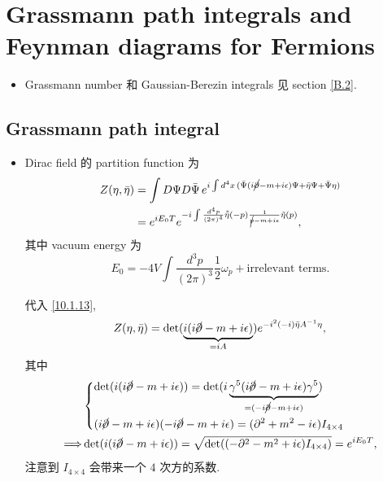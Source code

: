 \chapter{Grassmann path integrals and Feynman diagrams for Fermions}
\begin{itemize}
	\item Grassmann number 和 Gaussian-Berezin integrals 见 section \ref{B.2}.
\end{itemize}

\section{Grassmann path integral}
\begin{itemize}
	\item Dirac field 的 partition function 为
	\begin{align}
		Z(\eta, \bar{\eta}) &= \int D\Psi D\bar{\Psi} \, e^{i \int d^4 x \, (\bar{\Psi} (i \cancel{\partial} - m + i \epsilon) \Psi + \bar{\eta} \Psi + \bar{\Psi} \eta)} \notag \\
		&= e^{i E_0 T} e^{- i \int \frac{d^4 p}{(2 \pi)^4} \tilde{\bar{\eta}}(- p) \frac{1}{\cancel{p} - m + i \epsilon} \tilde{\eta}(p)},
	\end{align}
	其中 vacuum energy 为
	\begin{equation}
		E_0 = - 4 V \int \frac{d^3 p}{(2 \pi)^3} \frac{1}{2} \omega_p + \text{irrelevant terms}.
	\end{equation}
	
	\begin{tcolorbox}[title=calculation:]
		代入 \eqref{10.1.13},
		\begin{equation}
			Z(\eta, \bar{\eta}) = \det(\underbrace{i (i \cancel{\partial} - m + i \epsilon)}_{= i A}) e^{- i^2 (- i) \bar{\eta} A^{- 1} \eta},
		\end{equation}
		其中
		\begin{align}
			& \begin{dcases}
				\det(i (i \cancel{\partial} - m + i \epsilon)) = \det(i \underbrace{\gamma^5 (i \cancel{\partial} - m + i \epsilon) \gamma^5}_{= (- i \cancel{\partial} - m + i \epsilon)}) \\
				(i \cancel{\partial} - m + i \epsilon) (- i \cancel{\partial} - m + i \epsilon) = (\partial^2 + m^2 - i \epsilon) I_{4 \times 4}
			\end{dcases} \notag \\
			\Longrightarrow & \det(i (i \cancel{\partial} - m + i \epsilon)) = \sqrt{\det((- \partial^2 - m^2 + i \epsilon) I_{4 \times 4})} = e^{i E_0 T},
		\end{align}
		注意到 $I_{4 \times 4}$ 会带来一个 $4$ 次方的系数.
		

\end{tcolorbox}
\end{itemize}

